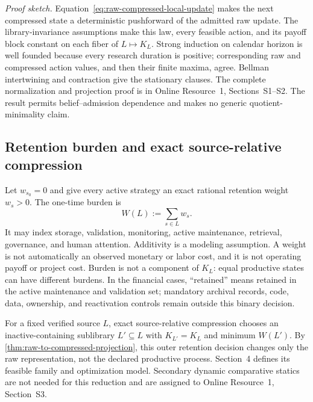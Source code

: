 \noindent\emph{Proof sketch.}
Equation~\eqref{eq:raw-compressed-local-update} makes the next compressed state
a deterministic pushforward of the admitted raw update.  The
library-invariance assumptions make this law, every feasible action, and its
payoff block constant on each fiber of \(L\mapsto K_L\).  Strong induction on
calendar horizon is well founded because every research duration is positive;
corresponding raw and compressed action values, and then their finite maxima,
agree.  Bellman intertwining and contraction give the stationary clauses.
The complete normalization and projection proof is in Online Resource~1,
Sections~S1--S2.  The result permits belief--admission dependence and makes no
generic quotient-minimality claim.

\subsection{Retention burden and exact source-relative compression}

Let \(w_{s_0}=0\) and give every active strategy an exact rational retention
weight \(w_s>0\).  The one-time burden is
\begin{equation}
  W(L):=\sum_{s\in L}w_s.
  \label{eq:library-burden}
\end{equation}
It may index storage, validation, monitoring, active maintenance, retrieval,
governance, and human attention. Additivity is a modeling assumption. A weight
is not automatically an observed monetary or labor cost, and it is not
operating payoff or project cost. Burden is not a component of \(K_L\): equal
productive states can have different burdens. In the financial cases,
``retained'' means retained in the active maintenance and validation set;
mandatory archival records, code, data, ownership, and reactivation controls
remain outside this binary decision.

For a fixed verified source \(L\), exact source-relative compression chooses
an inactive-containing sublibrary \(L'\subseteq L\) with
\(K_{L'}=K_L\) and minimum \(W(L')\).  By
\cref{thm:raw-to-compressed-projection}, this outer retention decision changes
only the raw representation, not the declared productive process.  Section~4
defines its feasible family and optimization model.  Secondary dynamic
comparative statics are not needed for this reduction and are assigned to
Online Resource~1, Section~S3.
